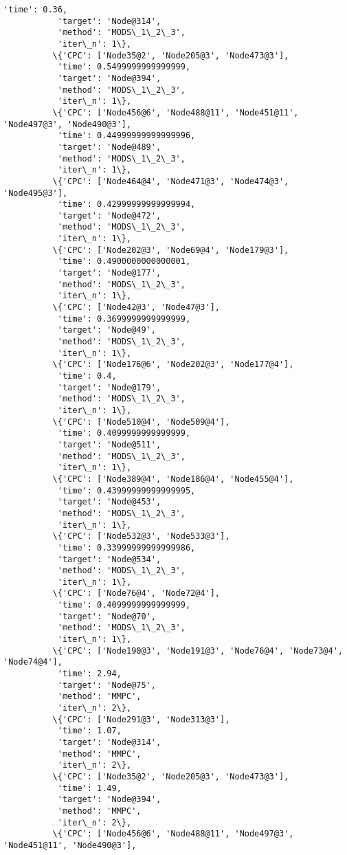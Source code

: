 \documentclass[11pt]{article}
\begin{document}
\begin{Verbatim}[commandchars=\\\{\}]
           'time': 0.36,
           'target': 'Node@314',
           'method': 'MODS\_1\_2\_3',
           'iter\_n': 1\},
          \{'CPC': ['Node35@2', 'Node205@3', 'Node473@3'],
           'time': 0.5499999999999999,
           'target': 'Node@394',
           'method': 'MODS\_1\_2\_3',
           'iter\_n': 1\},
          \{'CPC': ['Node456@6', 'Node488@11', 'Node451@11', 'Node497@3', 'Node490@3'],
           'time': 0.44999999999999996,
           'target': 'Node@489',
           'method': 'MODS\_1\_2\_3',
           'iter\_n': 1\},
          \{'CPC': ['Node464@4', 'Node471@3', 'Node474@3', 'Node495@3'],
           'time': 0.42999999999999994,
           'target': 'Node@472',
           'method': 'MODS\_1\_2\_3',
           'iter\_n': 1\},
          \{'CPC': ['Node202@3', 'Node69@4', 'Node179@3'],
           'time': 0.4900000000000001,
           'target': 'Node@177',
           'method': 'MODS\_1\_2\_3',
           'iter\_n': 1\},
          \{'CPC': ['Node42@3', 'Node47@3'],
           'time': 0.3699999999999999,
           'target': 'Node@49',
           'method': 'MODS\_1\_2\_3',
           'iter\_n': 1\},
          \{'CPC': ['Node176@6', 'Node202@3', 'Node177@4'],
           'time': 0.4,
           'target': 'Node@179',
           'method': 'MODS\_1\_2\_3',
           'iter\_n': 1\},
          \{'CPC': ['Node510@4', 'Node509@4'],
           'time': 0.4099999999999999,
           'target': 'Node@511',
           'method': 'MODS\_1\_2\_3',
           'iter\_n': 1\},
          \{'CPC': ['Node389@4', 'Node186@4', 'Node455@4'],
           'time': 0.43999999999999995,
           'target': 'Node@453',
           'method': 'MODS\_1\_2\_3',
           'iter\_n': 1\},
          \{'CPC': ['Node532@3', 'Node533@3'],
           'time': 0.33999999999999986,
           'target': 'Node@534',
           'method': 'MODS\_1\_2\_3',
           'iter\_n': 1\},
          \{'CPC': ['Node76@4', 'Node72@4'],
           'time': 0.4099999999999999,
           'target': 'Node@70',
           'method': 'MODS\_1\_2\_3',
           'iter\_n': 1\},
          \{'CPC': ['Node190@3', 'Node191@3', 'Node76@4', 'Node73@4', 'Node74@4'],
           'time': 2.94,
           'target': 'Node@75',
           'method': 'MMPC',
           'iter\_n': 2\},
          \{'CPC': ['Node291@3', 'Node313@3'],
           'time': 1.07,
           'target': 'Node@314',
           'method': 'MMPC',
           'iter\_n': 2\},
          \{'CPC': ['Node35@2', 'Node205@3', 'Node473@3'],
           'time': 1.49,
           'target': 'Node@394',
           'method': 'MMPC',
           'iter\_n': 2\},
          \{'CPC': ['Node456@6', 'Node488@11', 'Node497@3', 'Node451@11', 'Node490@3'],

\end{Verbatim}
\end{document}
